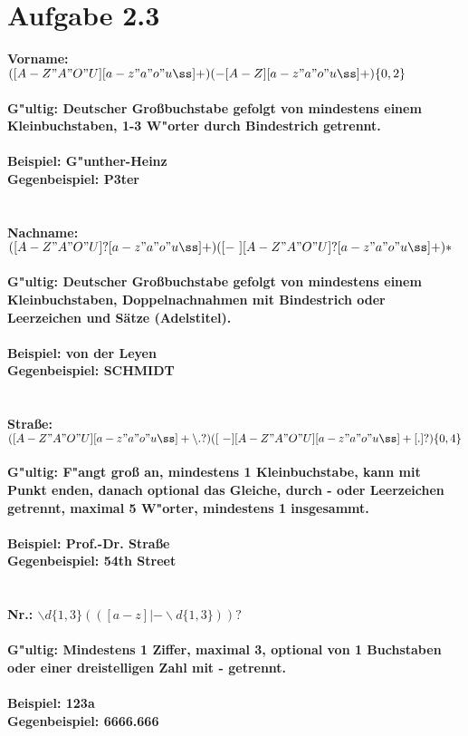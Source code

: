 \documentclass{article}
\date{}
\begin{document}
\section*{Aufgabe 2.3}

\bf{Vorname: }\normalfont $([A-Z"A"O"U][a-z"a"o"uß]+)(-[A-Z][a-z"a"o"uß]+)\lbrace0,2\rbrace$\\
\\
G"ultig: Deutscher Großbuchstabe gefolgt von mindestens einem Kleinbuchstaben, 1-3 W"orter durch Bindestrich getrennt.\\
\\
Beispiel: G"unther-Heinz\\
Gegenbeispiel: P3ter\\
\\
\\
\bf{Nachname: }\normalfont $([A-Z"A"O"U]?[a-z"a"o"uß]+)([-\text{ }][A-Z"A"O"U]?[a-z"a"o"uß]+)*$\\
\\
G"ultig: Deutscher Großbuchstabe gefolgt von mindestens einem Kleinbuchstaben, Doppelnachnahmen mit Bindestrich oder Leerzeichen und Sätze (Adelstitel).\\
\\
Beispiel: von der Leyen\\
Gegenbeispiel: SCHMIDT\\
\\
\\
\bf{Straße: }\normalfont $([A-Z"A"O"U][a-z"a"o"uß]+\backslash.?)([\text{ }-][A-Z"A"O"U][a-z"a"o"uß]+[.]?)\lbrace0,4\rbrace$\\
\\
G"ultig: F"angt groß an, mindestens 1 Kleinbuchstabe, kann mit Punkt enden, danach optional das Gleiche, durch - oder Leerzeichen getrennt, maximal 5 W"orter, mindestens 1 insgesammt.\\
\\
Beispiel: Prof.-Dr. Straße\\
Gegenbeispiel: 54th Street\\
\\
\\
\bf{Nr.: }\normalfont $\backslash d\lbrace1,3\rbrace(([a-z]|-\backslash d\lbrace1,3\rbrace))?$\\
\\
G"ultig: Mindestens 1 Ziffer, maximal 3, optional von 1 Buchstaben oder einer dreistelligen Zahl mit - getrennt.\\
\\
Beispiel: 123a\\
Gegenbeispiel: 6666.666\\
\end{document}
